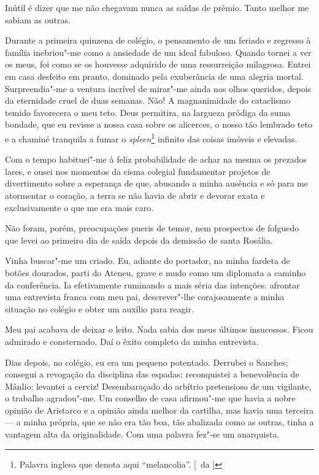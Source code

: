 Inútil é dizer que me não chegavam nunca as
saídas de prêmio. Tanto melhor me sabiam as outras. 

Durante a primeira
quinzena de colégio, o pensamento de um feriado e regresso à família
inebriou"-me como a ansiedade de um ideal fabuloso. Quando tornei a ver
os meus, foi como se os houvesse adquirido de uma ressurreição
milagrosa. Entrei em casa desfeito em pranto, dominado pela exuberância
de uma alegria mortal. Surpreendia"-me a ventura incrível de
mirar"-me ainda nos olhos queridos, depois da eternidade cruel de duas
semanas. Não! A magnanimidade do cataclismo temido favorecera o meu
teto. Deus permitira, na largueza pródiga da suma bondade, que eu
revisse a nossa casa sobre os alicerces, o nosso tão lembrado teto e a
chaminé tranquila a fumar o \textit{spleen}\footnote{ Palavra inglesa que denota aqui ``melancolia''. 
[~da ]} infinito das coisas imóveis e elevadas. 

Com o tempo habituei"-me à feliz probabilidade de achar na
mesma os prezados lares, e ousei nos momentos da cisma colegial
fundamentar projetos de divertimento sobre a esperança de que, abusando
a minha ausência e só para me atormentar o coração, a terra se não
havia de abrir e devorar exata e exclusivamente o que me era mais caro.

Não foram, porém, preocupações pueris de temor, nem prospectos de
folguedo que levei ao primeiro dia de saída depois da demissão de santa
Rosália. 

Vinha buscar"-me um criado. Eu, adiante do portador, na minha
fardeta de botões dourados, parti do Ateneu, grave e mudo como um
diplomata a caminho da conferência. Ia efetivamente ruminando a mais
séria das intenções: afrontar uma entrevista franca com meu pai,
descrever"-lhe corajosamente a minha situação no colégio e obter um
auxílio para reagir. 

Meu pai acabava de deixar o leito. Nada sabia dos
meus últimos insucessos. Ficou admirado e consternado. Daí o êxito completo 
da minha entrevista. 

Dias depois, no colégio, eu era um pequeno potentado. 
Derrubei o Sanches; consegui a
revogação da disciplina das espadas; reconquistei a benevolência de
Mânlio; levantei a cerviz! Desembaraçado do arbítrio pretensioso de um
vigilante, o trabalho agradou"-me. Um conselho de casa afirmou"-me
que havia a nobre opinião de Aristarco e a opinião ainda melhor da
cartilha, mas havia uma terceira --- a minha própria, que se não era
tão boa, tão abalizada como as outras, tinha a vantagem alta da
originalidade. Com uma palavra fez"-se um anarquista. 

